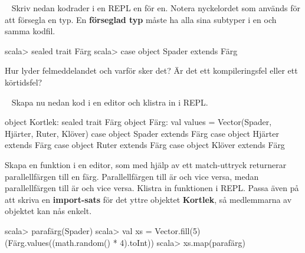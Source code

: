 


\QUESTEND








\QUESTBEGIN

\Task	\what~	Skriv nedan kodrader i en REPL en för en. Notera nyckelordet  som används för att försegla en typ. En \textbf{förseglad typ} måste ha alla sina subtyper i en och samma kodfil.
\begin{REPL}
scala> sealed trait Färg
scala> case object Spader extends Färg
\end{REPL}
\Subtask Hur lyder felmeddelandet och varför sker det? Är det ett kompileringsfel eller ett körtidsfel?

\Subtask  %
\what~  Skapa nu nedan kod i en editor och klistra in i REPL.
\begin{Code}
object Kortlek:
  sealed trait Färg
  object Färg:
      val values = Vector(Spader, Hjärter, Ruter, Klöver)
  case object Spader extends Färg
  case object Hjärter extends Färg
  case object Ruter extends Färg
  case object Klöver extends Färg
\end{Code}

\Subtask \label{subtask:match-sealedtrait} Skapa en funktion  i en editor, som med hjälp av ett match-uttryck returnerar parallellfärgen till en färg. Parallellfärgen till  är  och vice versa, medan parallellfärgen till  är  och vice versa. Klistra in funktionen i REPL. Passa även på att skriva en \textbf{import-sats} för det yttre objektet \textbf{Kortlek}, så medlemmarna av objektet kan nås enkelt.
\begin{REPL}
scala> parafärg(Spader)
scala> val xs = Vector.fill(5)(Färg.values((math.random() * 4).toInt))
scala> xs.map(parafärg)
\end{REPL}

